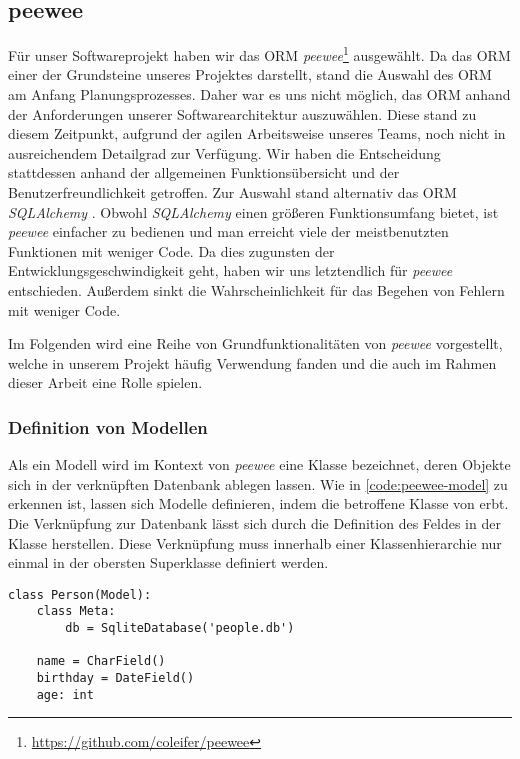 \subsection{peewee}
Für unser Softwareprojekt haben wir das ORM \emph{peewee}\footnote{\url{https://github.com/coleifer/peewee}} \cite{leifer_coleiferpeewee_2023} ausgewählt. Da das ORM einer der Grundsteine unseres Projektes darstellt, stand die Auswahl des ORM am Anfang Planungsprozesses. Daher war es uns nicht möglich, das ORM  anhand der Anforderungen unserer Softwarearchitektur auszuwählen. Diese stand zu diesem Zeitpunkt, aufgrund der agilen Arbeitsweise unseres Teams, noch nicht in ausreichendem Detailgrad zur Verfügung. Wir haben die Entscheidung stattdessen anhand der allgemeinen Funktionsübersicht und der Benutzerfreundlichkeit getroffen. Zur Auswahl stand alternativ das ORM \emph{SQLAlchemy} \cite{noauthor_sqlalchemy_2023}. Obwohl \emph{SQLAlchemy} einen größeren Funktionsumfang bietet, ist \emph{peewee} einfacher zu bedienen und man erreicht viele der meistbenutzten Funktionen mit weniger Code. Da dies zugunsten der Entwicklungsgeschwindigkeit geht, haben wir uns letztendlich für \emph{peewee} entschieden. Außerdem sinkt die Wahrscheinlichkeit für das Begehen von Fehlern mit weniger Code.

Im Folgenden wird eine Reihe von Grundfunktionalitäten von \emph{peewee} vorgestellt, welche in unserem Projekt häufig Verwendung fanden und die auch im Rahmen dieser Arbeit eine Rolle spielen.

\subsubsection*{Definition von Modellen}

Als ein Modell wird im Kontext von \emph{peewee} eine Klasse bezeichnet, deren Objekte sich in der verknüpften Datenbank ablegen lassen. Wie in \autoref{code:peewee-model} zu erkennen ist, lassen sich Modelle definieren, indem die betroffene Klasse von  erbt. Die Verknüpfung zur Datenbank lässt sich durch die Definition des Feldes  in der Klasse  herstellen. Diese Verknüpfung muss innerhalb einer Klassenhierarchie nur einmal in der obersten Superklasse definiert werden.

\lstset{language=python}
\begin{lstlisting}[caption={Python-Code zur Definition eines \emph{peewee}-Modells. Es modelliert eine Person mit einem Namen und einem Geburtstag. Weiterhin besitzt die Klasse das nicht-persistente Feld \code{age}. \cite{noauthor_quickstart_2023}}, label=code:peewee-model]
class Person(Model):
    class Meta:
        db = SqliteDatabase('people.db')

    name = CharField()
    birthday = DateField()
    age: int
\end{lstlisting}

